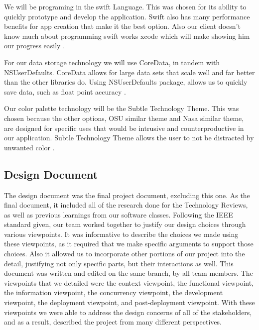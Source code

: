 \documentclass[onecolumn, draftclsnofoot,10pt, compsoc]{IEEEtran}
\begin{document}
We will be programing in the swift Language.
This was chosen for its ability to quickly prototype and develop the application.
Swift also has many performance benefits for app creation that make it the best option.
Also our client doesn't know much about programming swift works xcode which will make showing him our progress easily \cite{techDocShepherd}.

For our data storage technology we will use CoreData, in tandem with NSUserDefaults.
CoreData allows for large data sets that scale well and far better than the other libraries do.
Using NSUserDefaults package, allows us to quickly save data, such as float point accuracy \cite{techDocShepherd}.

Our color palette technology will be the Subtle Technology Theme.
This was chosen because the other options, OSU similar theme and Nasa similar theme, are designed for specific uses that would be intrusive and counterproductive in our application.
Subtle Technology Theme allows the user to not be distracted by unwanted color \cite{techDocShepherd}.

\subsection{Design Document}
The design document was the final project document, excluding this one.
As the final document, it included all of the research done for the Technology Reviews, as well as previous learnings from our software classes.
Following the IEEE standard given, our team worked together to justify our design choices through various viewpoints.
It was informative to describe the choices we made using these viewpoints, as it required that we make specific arguments to support those choices.
Also it allowed us to incorporate other portions of our project into the detail, justifying not only specific parts, but their interactions as well.
This document was written and edited on the same branch, by all team members.
The viewpoints that we detailed were the context viewpoint, the functional viewpoint, the information viewpoint, the concurrency viewpoint, the development viewpoint, the deployment viewpoint, and post-deployment viewpoint.
With these viewpoints we were able to address the design concerns of all of the stakeholders, and as a result, described the project from many different perspectives.
\end{document}
